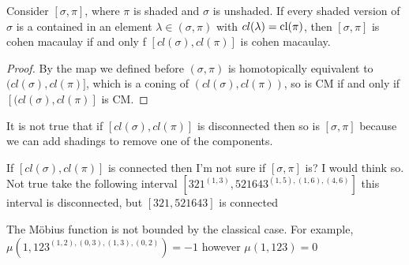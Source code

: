 \documentclass[11pt,a4paper,oneside]{article}
\begin{document}
\begin{lem}
Consider $[\sigma,\pi]$, where $\pi$ is shaded and $\sigma$ is unshaded. If every shaded version of $\sigma$ is a contained in an element $\lambda\in(\sigma,\pi)$ with $cl(\lambda)=\operatorname{\textrm{cl}}(\pi)$, then $[\sigma,\pi]$ is cohen macaulay if and only f $[cl(\sigma),cl(\pi)]$ is cohen macaulay.
\begin{proof}
By the map we defined before $(\sigma,\pi)$ is homotopically equivalent to $(cl(\sigma),cl(\pi)]$, which is a coning of $(cl(\sigma),cl(\pi))$, so is CM if and only if $[(cl(\sigma),cl(\pi)]$ is CM.
\end{proof}
\end{lem}

It is not true that if $[cl(\sigma),cl(\pi)]$ is disconnected then so is $[\sigma,\pi]$ because we can add shadings to remove one of the components.

If $[cl(\sigma),cl(\pi)]$ is connected then I'm not sure if $[\sigma,\pi]$ is? I would think so. Not true take the following interval $[321^{(1, 3)},521643^{(1, 5), (1, 6), (4, 6)}]$ this interval is disconnected, but $[321,521643]$ is connected

The M\"obius function is not bounded by the classical case. For example, $\mu(1,123^{(1, 2), (0, 3), (1, 3), (0, 2)})=-1$ however $\mu(1,123)=0$


\fi



\end{document}
